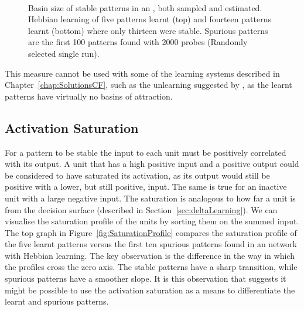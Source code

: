 \begin{figure}[p]
	\small
	\center
	
	\vspace{1cm}
	\\
	
	\caption{Basin size of stable patterns in an , both sampled and estimated. Hebbian learning of five patterns learnt (top) and fourteen patterns learnt (bottom) where only thirteen were stable. Spurious patterns are the first 100 patterns found with 2000 probes (Randomly selected single run). }
	\label{fig:BasinSize}
\end{figure}

This measure cannot be used with some of the learning systems described in Chapter~\ref{chap:SolutionsCF}, such as the unlearning suggested by \citet{vanHemmen1997}, as the learnt patterns have virtually no basins of attraction.  



\subsection{Activation Saturation}


For a pattern to be stable the input to each unit must be positively correlated with its output.  A unit that has a high positive input and a positive output could be considered to have saturated its activation, as its output would still be positive with a lower, but still positive, input.  The same is true for an inactive unit with a large negative input.  The saturation is analogous to how far a unit is from the decision surface (described in Section~\ref{sec:deltaLearning}). We can visualise the saturation profile of the units by sorting them on the summed input. The top graph in Figure~\ref{fig:SaturationProfile} compares the saturation profile of the five learnt patterns versus the first ten spurious patterns found in an  network with Hebbian learning. The key observation is the difference in the way in which the profiles cross the zero axis.  The stable patterns have a sharp transition, while spurious patterns have a smoother slope. It is this observation that suggests it might be possible to use the activation saturation as a means to differentiate the learnt and spurious patterns. 

